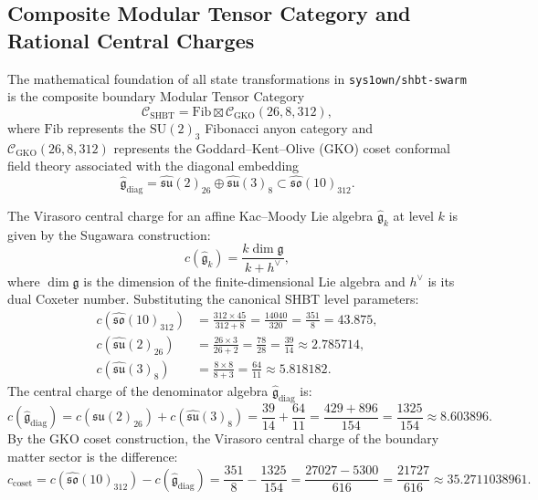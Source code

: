 \documentclass[11pt,onecolumn]{article}
\begin{document}
\FloatBarrier
\subsection{Composite Modular Tensor Category and Rational Central Charges}
The mathematical foundation of all state transformations in \texttt{sys1own/shbt-swarm} is the composite boundary Modular Tensor Category
\begin{equation}
\mathcal{C}_{\text{SHBT}} = \text{Fib} \boxtimes \mathcal{C}_{\text{GKO}}(26, 8, 312),
\label{eq:composite_mtc}
\end{equation}
where $\text{Fib}$ represents the $\text{SU}(2)_3$ Fibonacci anyon category and $\mathcal{C}_{\text{GKO}}(26, 8, 312)$ represents the Goddard--Kent--Olive (GKO) coset conformal field theory associated with the diagonal embedding
\begin{equation}
\hat{\mathfrak{g}}_{\text{diag}} = \hat{\mathfrak{su}}(2)_{26} \oplus \hat{\mathfrak{su}}(3)_8 \subset \hat{\mathfrak{so}}(10)_{312}.
\label{eq:gko_coset}
\end{equation}

The Virasoro central charge for an affine Kac--Moody Lie algebra $\hat{\mathfrak{g}}_k$ at level $k$ is given by the Sugawara construction:
\begin{equation}
c(\hat{\mathfrak{g}}_k) = \frac{k \dim \mathfrak{g}}{k + h^\vee},
\label{eq:sugawara_central_charge}
\end{equation}
where $\dim \mathfrak{g}$ is the dimension of the finite-dimensional Lie algebra and $h^\vee$ is its dual Coxeter number. Substituting the canonical SHBT level parameters:
\begin{align}
c(\hat{\mathfrak{so}}(10)_{312}) &= \frac{312 \times 45}{312 + 8} = \frac{14040}{320} = \frac{351}{8} = 43.875, \label{eq:c_so10} \\
c(\hat{\mathfrak{su}}(2)_{26}) &= \frac{26 \times 3}{26 + 2} = \frac{78}{28} = \frac{39}{14} \approx 2.785714, \label{eq:c_su2} \\
c(\hat{\mathfrak{su}}(3)_8) &= \frac{8 \times 8}{8 + 3} = \frac{64}{11} \approx 5.818182. \label{eq:c_su3}
\end{align}
The central charge of the denominator algebra $\hat{\mathfrak{g}}_{\text{diag}}$ is:
\begin{equation}
c(\hat{\mathfrak{g}}_{\text{diag}}) = c(\hat{\mathfrak{su}}(2)_{26}) + c(\hat{\mathfrak{su}}(3)_8) = \frac{39}{14} + \frac{64}{11} = \frac{429 + 896}{154} = \frac{1325}{154} \approx 8.603896.
\end{equation}
By the GKO coset construction, the Virasoro central charge of the boundary matter sector is the difference:
\begin{equation}
c_{\text{coset}} = c(\hat{\mathfrak{so}}(10)_{312}) - c(\hat{\mathfrak{g}}_{\text{diag}}) = \frac{351}{8} - \frac{1325}{154} = \frac{27027 - 5300}{616} = \frac{21727}{616} \approx 35.2711038961.
\label{eq:c_coset}
\end{equation}
\end{document}
